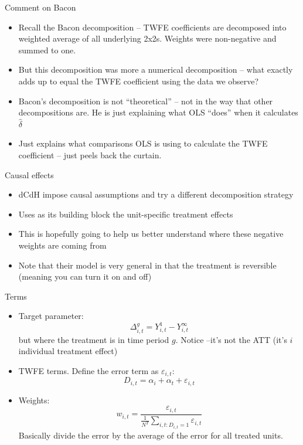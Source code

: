\documentclass{beamer}
\begin{document}
\begin{frame}{Comment on Bacon}

\begin{itemize}
\item Recall the Bacon decomposition -- TWFE coefficients are decomposed into weighted average of all underlying 2x2s. Weights were non-negative and summed to one.
\item But this decomposition was more a numerical decomposition -- what exactly adds up to equal the TWFE coefficient using the data we observe?
\item Bacon's decomposition is not ``theoretical'' -- not in the way that other decompositions are. He is just explaining what OLS ``does'' when it calculates $\widehat{\delta}$
\item Just explains what comparisons OLS is using to calculate the TWFE coefficient -- just peels back the curtain.
\end{itemize}

\end{frame}

\begin{frame}{Causal effects}

\begin{itemize}
\item dCdH impose causal assumptions and try a different decomposition strategy
\item Uses as its building block the unit-specific treatment effects
\item This is hopefully going to help us better understand where these negative weights are coming from
\item Note that their model is very general in that the treatment is reversible (meaning you can turn it on and off)
\end{itemize}

\end{frame}

\begin{frame}{Terms}

\begin{itemize}
\item Target parameter: $$\Delta^g_{i,t} = Y^1_{i,t} - Y^\infty_{i,t}$$ but where the treatment is in time period $g$. Notice --it's not the ATT (it's $i$ individual treatment effect)
\item TWFE terms. Define the error term as $\varepsilon_{i,t}$: $$D_{i,t} = \alpha_i + \alpha_t + \varepsilon_{i,t}$$
\item Weights: $$w_{i,t} = \frac{\varepsilon_{i,t}}{\frac{1}{N^T} \sum_{i,t:D_{i,t}=1} \varepsilon_{i,t}}$$Basically divide the error by the average of the error for all treated units. 
\end{itemize}

\end{frame}
\end{document}
